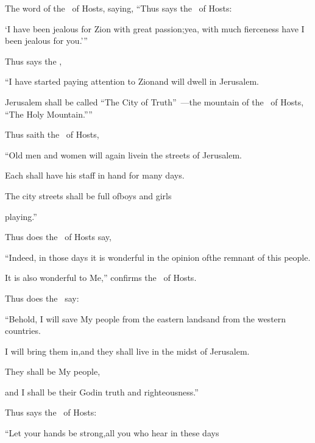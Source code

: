 
\begin{inparaenum}
  \pa{} The word of the \lord\ of Hosts, saying,\pa{} ``Thus says the \lord\ of Hosts:%

  \pa{}`I have been jealous for Zion with great passion;\pa{}yea, with much fierceness have I been jealous for you.'\thinspace''%

  \pa{} Thus says the \lord,%

  \pb{}``I have started paying attention to%
  Zion\pa{}and will dwell in Jerusalem.%

  \pb{}Jerusalem shall be called ``The City of Truth''~---\pa{}the mountain of the \lord\ of Hosts, ``The Holy Mountain.''\thinspace''%

  \pa{} Thus saith the \lord\ of Hosts,%

  \pb{}``Old men and women will again live\pa{}in the streets of Jerusalem.%

  \pb{}Each shall  have his staff in hand for many days.%

  \pb{} The city streets shall be full of\pa{}boys and girls%

  \pb{}playing.''%

  \pa{} Thus does the \lord\ of Hosts say,%

  \pb{}``Indeed, in those days it is wonderful in the opinion of\pa{}the remnant of this people.%

  \pb{}It is also wonderful to Me,'' confirms the \lord\ of Hosts.%

  \pa{} Thus does the \lord\ say:%

  \pb{}``Behold, I will save My people from the eastern lands\pa{}and from the western countries.%

  \pb{} I will bring them in,\pa{}and they shall live in the midst of Jerusalem.%

  \pb{}They shall be My people,%

  \pb{}and I shall be their God\pa{}in truth and righteousness.''%

  \pa{} Thus says the \lord\ of Hosts:%

  \pb{}``Let your hands be strong,\pa{}all you who hear in these days%


\end{inparaenum}
